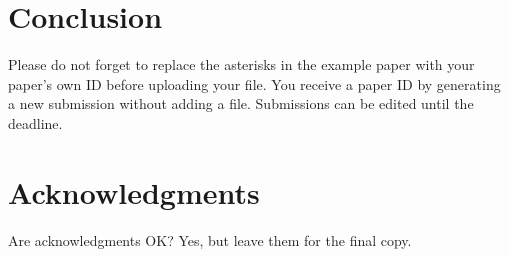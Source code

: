 \documentclass[11pt,twoside,twocolumn,a4paper]{article}
\begin{document}
\section{Conclusion}

Please do not forget to replace the asterisks in the example paper with your 
paper's own ID before uploading your file. You receive a paper ID by generating 
a new submission without adding a file. Submissions can be edited until the 
deadline. 


\section*{Acknowledgments}

Are acknowledgments OK?  Yes, but leave them for the final copy.


{\small


}
\end{document}
